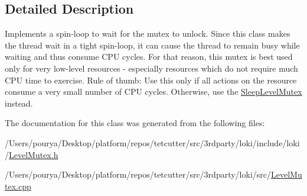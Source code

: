\subsection{Detailed Description}
Implements a spin-\/loop to wait for the mutex to unlock. Since this class makes the thread wait in a tight spin-\/loop, it can cause the thread to remain busy while waiting and thus consume C\+P\+U cycles. For that reason, this mutex is best used only for very low-\/level resources -\/ especially resources which do not require much C\+P\+U time to exercise. Rule of thumb\+: Use this only if all actions on the resource consume a very small number of C\+P\+U cycles. Otherwise, use the \hyperlink{classLoki_1_1SleepLevelMutex}{Sleep\+Level\+Mutex} instead. 

The documentation for this class was generated from the following files\+:\begin{DoxyCompactItemize}
\item 
/\+Users/pourya/\+Desktop/platform/repos/tetcutter/src/3rdparty/loki/include/loki/\hyperlink{LevelMutex_8h}{Level\+Mutex.\+h}\item 
/\+Users/pourya/\+Desktop/platform/repos/tetcutter/src/3rdparty/loki/src/\hyperlink{LevelMutex_8cpp}{Level\+Mutex.\+cpp}\end{DoxyCompactItemize}
